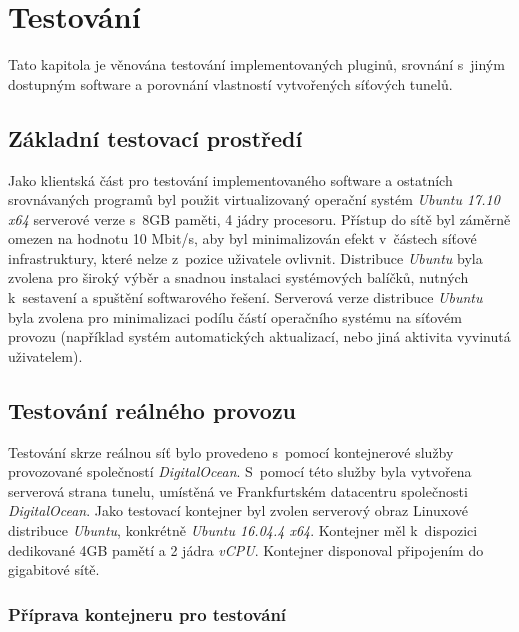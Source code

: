 \documentclass[thesis=M,czech]{FITthesis}[2012/10/20]
\begin{document}
    
    


\chapter{Testování}

Tato kapitola je věnována testování implementovaných pluginů, srovnání s~jiným dostupným software a porovnání vlastností vytvořených síťových tunelů.

\section{Základní testovací prostředí}
\label{test:prostredi}

Jako klientská část pro testování implementovaného software a ostatních srovnávaných programů byl použit virtualizovaný operační systém \textit{Ubuntu 17.10 x64} serverové verze s~8GB paměti, 4 jádry procesoru. Přístup do sítě byl záměrně omezen na hodnotu 10 Mbit/s, aby byl minimalizován efekt  v~částech síťové infrastruktury, které nelze z~pozice uživatele ovlivnit. Distribuce \textit{Ubuntu} byla zvolena pro široký výběr a snadnou instalaci systémových balíčků, nutných k~sestavení a spuštění softwarového řešení. Serverová verze distribuce \textit{Ubuntu} byla zvolena pro minimalizaci podílu částí operačního systému na síťovém provozu (například systém automatických aktualizací, nebo jiná aktivita vyvinutá uživatelem).

\section{Testování reálného provozu}

Testování skrze reálnou síť bylo provedeno s~pomocí kontejnerové služby provozované společností \textit{DigitalOcean}. S~pomocí této služby byla vytvořena serverová strana tunelu, umístěná ve Frankfurtském datacentru společnosti \textit{\mbox{DigitalOcean}}. Jako testovací kontejner byl zvolen serverový obraz Linuxové distribuce \textit{Ubuntu}, konkrétně \textit{Ubuntu 16.04.4 x64}. Kontejner měl k~dispozici dedikované 4GB pamětí a 2 jádra \textit{vCPU}. Kontejner disponoval připojením do gigabitové sítě.

\subsection{Příprava kontejneru pro testování}
\end{document}
